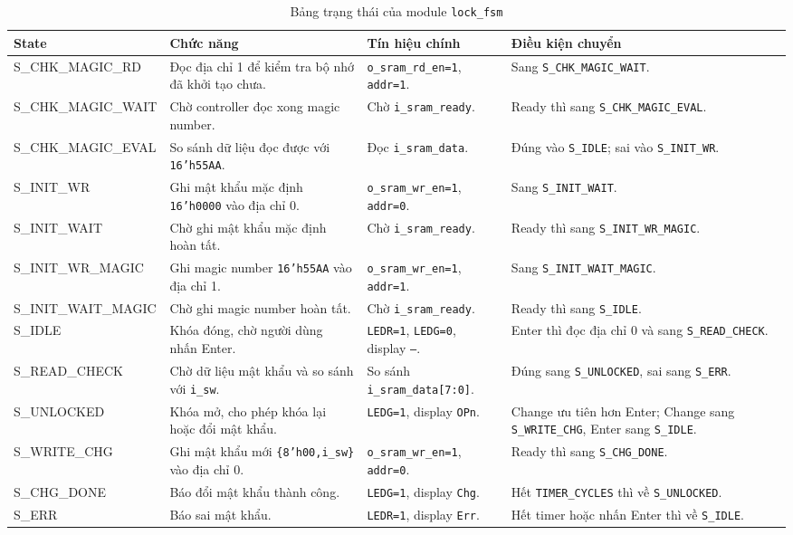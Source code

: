 \documentclass[13pt,a4paper]{article}
\begin{document}
\begin{table}[H]
\centering
\caption{Bảng trạng thái của module \texttt{lock\_fsm}}
\label{tab:fsm_state}
\scriptsize
\begin{tabularx}{\textwidth}{|>{\ttfamily}p{3.2cm}|X|X|X|}
\hline
\textbf{State} & \textbf{Chức năng} & \textbf{Tín hiệu chính} & \textbf{Điều kiện chuyển}\\
\hline
S\_CHK\_MAGIC\_RD & Đọc địa chỉ 1 để kiểm tra bộ nhớ đã khởi tạo chưa. & \texttt{o\_sram\_rd\_en=1}, \texttt{addr=1}. & Sang \texttt{S\_CHK\_MAGIC\_WAIT}.\\
\hline
S\_CHK\_MAGIC\_WAIT & Chờ controller đọc xong magic number. & Chờ \texttt{i\_sram\_ready}. & Ready thì sang \texttt{S\_CHK\_MAGIC\_EVAL}.\\
\hline
S\_CHK\_MAGIC\_EVAL & So sánh dữ liệu đọc được với \texttt{16'h55AA}. & Đọc \texttt{i\_sram\_data}. & Đúng vào \texttt{S\_IDLE}; sai vào \texttt{S\_INIT\_WR}.\\
\hline
S\_INIT\_WR & Ghi mật khẩu mặc định \texttt{16'h0000} vào địa chỉ 0. & \texttt{o\_sram\_wr\_en=1}, \texttt{addr=0}. & Sang \texttt{S\_INIT\_WAIT}.\\
\hline
S\_INIT\_WAIT & Chờ ghi mật khẩu mặc định hoàn tất. & Chờ \texttt{i\_sram\_ready}. & Ready thì sang \texttt{S\_INIT\_WR\_MAGIC}.\\
\hline
S\_INIT\_WR\_MAGIC & Ghi magic number \texttt{16'h55AA} vào địa chỉ 1. & \texttt{o\_sram\_wr\_en=1}, \texttt{addr=1}. & Sang \texttt{S\_INIT\_WAIT\_MAGIC}.\\
\hline
S\_INIT\_WAIT\_MAGIC & Chờ ghi magic number hoàn tất. & Chờ \texttt{i\_sram\_ready}. & Ready thì sang \texttt{S\_IDLE}.\\
\hline
S\_IDLE & Khóa đóng, chờ người dùng nhấn Enter. & \texttt{LEDR=1}, \texttt{LEDG=0}, display \texttt{---}. & Enter thì đọc địa chỉ 0 và sang \texttt{S\_READ\_CHECK}.\\
\hline
S\_READ\_CHECK & Chờ dữ liệu mật khẩu và so sánh với \texttt{i\_sw}. & So sánh \texttt{i\_sram\_data[7:0]}. & Đúng sang \texttt{S\_UNLOCKED}, sai sang \texttt{S\_ERR}.\\
\hline
S\_UNLOCKED & Khóa mở, cho phép khóa lại hoặc đổi mật khẩu. & \texttt{LEDG=1}, display \texttt{OPn}. & Change ưu tiên hơn Enter; Change sang \texttt{S\_WRITE\_CHG}, Enter sang \texttt{S\_IDLE}.\\
\hline
S\_WRITE\_CHG & Ghi mật khẩu mới \texttt{\{8'h00,i\_sw\}} vào địa chỉ 0. & \texttt{o\_sram\_wr\_en=1}, \texttt{addr=0}. & Ready thì sang \texttt{S\_CHG\_DONE}.\\
\hline
S\_CHG\_DONE & Báo đổi mật khẩu thành công. & \texttt{LEDG=1}, display \texttt{Chg}. & Hết \texttt{TIMER\_CYCLES} thì về \texttt{S\_UNLOCKED}.\\
\hline
S\_ERR & Báo sai mật khẩu. & \texttt{LEDR=1}, display \texttt{Err}. & Hết timer hoặc nhấn Enter thì về \texttt{S\_IDLE}.\\
\hline
\end{tabularx}
\end{table}
\normalsize
\end{document}
